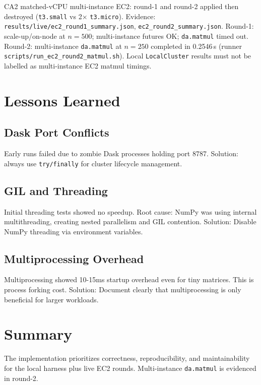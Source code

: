 CA2 matched-vCPU multi-instance EC2: round-1 and round-2 applied then destroyed (\texttt{t3.small} vs 2× \texttt{t3.micro}). Evidence: \texttt{results/live/ec2\_round1\_summary.json}, \texttt{ec2\_round2\_summary.json}. Round-1: scale-up/on-node at $n{=}500$; multi-instance futures OK; \texttt{da.matmul} timed out. Round-2: multi-instance \texttt{da.matmul} at $n{=}250$ completed in 0.2546\,s (runner \texttt{scripts/run\_ec2\_round2\_matmul.sh}). Local \texttt{LocalCluster} results must not be labelled as multi-instance EC2 matmul timings.

\section{Lessons Learned}

\subsection{Dask Port Conflicts}

Early runs failed due to zombie Dask processes holding port 8787. Solution: always use \texttt{try/finally} for cluster lifecycle management.

\subsection{GIL and Threading}

Initial threading tests showed no speedup. Root cause: NumPy was using internal multithreading, creating nested parallelism and GIL contention. Solution: Disable NumPy threading via environment variables.

\subsection{Multiprocessing Overhead}

Multiprocessing showed 10-15ms startup overhead even for tiny matrices. This is process forking cost. Solution: Document clearly that multiprocessing is only beneficial for larger workloads.

\section{Summary}

The implementation prioritizes correctness, reproducibility, and maintainability for the local harness plus live EC2 rounds. Multi-instance \texttt{da.matmul} is evidenced in round-2.

